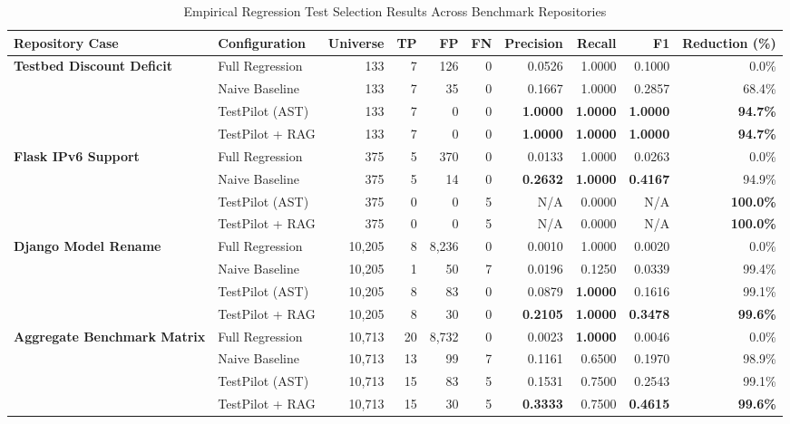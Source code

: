 \begin{table}[t]
\centering
\caption{Empirical Regression Test Selection Results Across Benchmark Repositories}
\label{tab:benchmark_results}
\small
\begin{tabular}{llrrrrrrrr}
\toprule
\textbf{Repository Case} & \textbf{Configuration} & \textbf{Universe} & \textbf{TP} & \textbf{FP} & \textbf{FN} & \textbf{Precision} & \textbf{Recall} & \textbf{F1} & \textbf{Reduction (\%)} \\
\midrule
\multirow{4}{*}{\textbf{Testbed Discount Deficit}} 
  & Full Regression & 133 & 7 & 126 & 0 & 0.0526 & 1.0000 & 0.1000 & 0.0\% \\
  & Naive Baseline & 133 & 7 & 35 & 0 & 0.1667 & 1.0000 & 0.2857 & 68.4\% \\
  & TestPilot (AST) & 133 & 7 & 0 & 0 & \textbf{1.0000} & \textbf{1.0000} & \textbf{1.0000} & \textbf{94.7\%} \\
  & TestPilot + RAG & 133 & 7 & 0 & 0 & \textbf{1.0000} & \textbf{1.0000} & \textbf{1.0000} & \textbf{94.7\%} \\
\midrule
\multirow{4}{*}{\textbf{Flask IPv6 Support}} 
  & Full Regression & 375 & 5 & 370 & 0 & 0.0133 & 1.0000 & 0.0263 & 0.0\% \\
  & Naive Baseline & 375 & 5 & 14 & 0 & \textbf{0.2632} & \textbf{1.0000} & \textbf{0.4167} & 94.9\% \\
  & TestPilot (AST) & 375 & 0 & 0 & 5 & N/A & 0.0000 & N/A & \textbf{100.0\%} \\
  & TestPilot + RAG & 375 & 0 & 0 & 5 & N/A & 0.0000 & N/A & \textbf{100.0\%} \\
\midrule
\multirow{4}{*}{\textbf{Django Model Rename}} 
  & Full Regression & 10,205 & 8 & 8,236 & 0 & 0.0010 & 1.0000 & 0.0020 & 0.0\% \\
  & Naive Baseline & 10,205 & 1 & 50 & 7 & 0.0196 & 0.1250 & 0.0339 & 99.4\% \\
  & TestPilot (AST) & 10,205 & 8 & 83 & 0 & 0.0879 & \textbf{1.0000} & 0.1616 & 99.1\% \\
  & TestPilot + RAG & 10,205 & 8 & 30 & 0 & \textbf{0.2105} & \textbf{1.0000} & \textbf{0.3478} & \textbf{99.6\%} \\
\midrule
\multirow{4}{*}{\textbf{Aggregate Benchmark Matrix}} 
  & Full Regression & 10,713 & 20 & 8,732 & 0 & 0.0023 & \textbf{1.0000} & 0.0046 & 0.0\% \\
  & Naive Baseline & 10,713 & 13 & 99 & 7 & 0.1161 & 0.6500 & 0.1970 & 98.9\% \\
  & TestPilot (AST) & 10,713 & 15 & 83 & 5 & 0.1531 & 0.7500 & 0.2543 & 99.1\% \\
  & TestPilot + RAG & 10,713 & 15 & 30 & 5 & \textbf{0.3333} & 0.7500 & \textbf{0.4615} & \textbf{99.6\%} \\
\bottomrule
\end{tabular}
\end{table}
